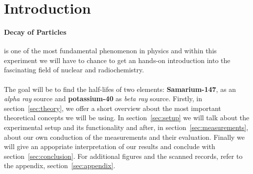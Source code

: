 \section{Introduction}
\label{sec:introduction}
\paragraph{Decay of Particles} is one of the most fundamental phenomenon
in physics and within this experiment we will have to chance
to get an hands-on introduction into the fascinating field of nuclear and radiochemistry. \\\\ 
The goal will be to find the half-lifes of two elements: \textbf{Samarium-147}, as an \textit{alpha ray}
source and \textbf{potassium-40} as \textit{beta ray} source. Firstly, in section~\ref{sec:theory}, 
we offer a short overview about the most important theoretical concepts we will be using.
In section~\ref{sec:setup} we will talk about the experimental setup and its 
functionality and after, in section~\ref{sec:measurements}, about our
own conduction of the measurements and their evaluation. Finally
we will give an appopriate interpretation of our results and conclude with
section~\ref{sec:conclusion}. For additional figures and the scanned records,
refer to the appendix, section~\ref{sec:appendix}.
